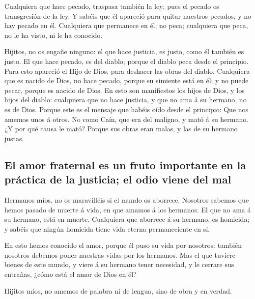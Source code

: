  Cualquiera que hace pecado, traspasa también la ley; pues
el pecado es transgresión de la ley.  Y sabéis que él
apareció para quitar nuestros pecados, y no hay pecado en él.
 Cualquiera que permanece en él, no peca; cualquiera que
peca, no le ha visto, ni le ha conocido.

 Hijitos, no os engañe ninguno: el que hace justicia, es
justo, como él también es justo.  El que hace pecado, es
del diablo; porque el diablo peca desde el principio. Para esto apareció
el Hijo de Dios, para deshacer las obras del diablo. 
Cualquiera que es nacido de Dios, no hace pecado, porque su simiente
está en él; y no puede pecar, porque es nacido de Dios. 
En esto son manifiestos los hijos de Dios, y los hijos del diablo:
cualquiera que no hace justicia, y que no ama á su hermano, no es de
Dios.  Porque este es el mensaje que habéis oído desde el
principio: Que nos amemos unos á otros.  No como Caín,
que era del maligno, y mató á su hermano. ¿Y por qué causa le mató?
Porque sus obras eran malas, y las de su hermano justas.

\hypertarget{el-amor-fraternal-es-un-fruto-importante-en-la-pruxe1ctica-de-la-justicia-el-odio-viene-del-mal}{%
\subsection{El amor fraternal es un fruto importante en la práctica de
la justicia; el odio viene del
mal}\label{el-amor-fraternal-es-un-fruto-importante-en-la-pruxe1ctica-de-la-justicia-el-odio-viene-del-mal}}

 Hermanos míos, no os maravilléis si el mundo os
aborrece.  Nosotros sabemos que hemos pasado de muerte á
vida, en que amamos á los hermanos. El que no ama á su hermano, está en
muerte.  Cualquiera que aborrece á su hermano, es
homicida; y sabéis que ningún homicida tiene vida eterna permaneciente
en sí.

 En esto hemos conocido el amor, porque él puso su vida
por nosotros: también nosotros debemos poner nuestras vidas por los
hermanos.  Mas el que tuviere bienes de este mundo, y
viere á su hermano tener necesidad, y le cerrare sus entrañas, ¿cómo
está el amor de Dios en él?

 Hijitos míos, no amemos de palabra ni de lengua, sino de
obra y en verdad.

